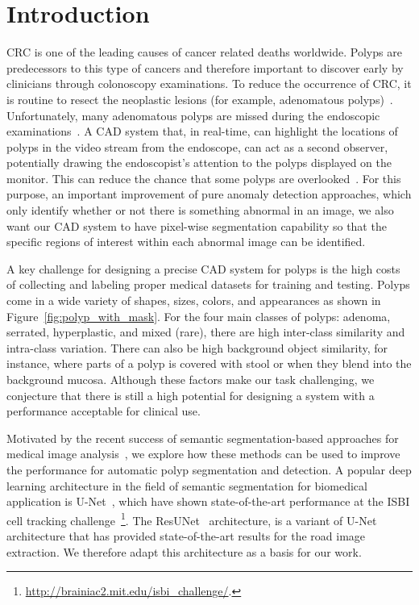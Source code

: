 \documentclass[conference]{IEEEtran}
\begin{document}
\vspace{-0.1cm}
\section{Introduction}
\label{sec:Introduction}
 
\ac{CRC} is one of the leading causes of cancer related deaths worldwide. Polyps are predecessors to this type of cancers and therefore important to discover early by clinicians through colonoscopy examinations.
To reduce the occurrence of \ac{CRC}, 
it is routine to resect the neoplastic lesions (for example, adenomatous polyps)~\cite{zauber2012colonoscopic}. 
Unfortunately, many adenomatous polyps are missed during the endoscopic examinations~\cite{van2006polyp}.
A \ac{CAD} system that, in real-time, can highlight the locations of polyps in the video stream from the endoscope, can act as a second observer, potentially drawing the endoscopist's attention to the polyps displayed on the monitor. This can reduce the chance that some polyps are overlooked~\cite{mori2018detecting}. For this purpose,  
an important improvement of pure anomaly detection approaches, which  only identify whether or not there is something abnormal in an image, we also want our \ac{CAD} system to have pixel-wise segmentation capability so that the specific regions of interest within each abnormal image can be identified.

A key challenge for designing a precise \ac{CAD} system
for polyps is the high costs of collecting and labeling proper medical datasets for training and testing. 
Polyps  come in a wide variety of shapes, sizes, colors, and appearances as shown  in Figure~\ref{fig:polyp_with_mask}. 
For the four main classes of polyps: adenoma, serrated, hyperplastic, and mixed (rare), there are high inter-class similarity and intra-class variation. 
There can also be high background object similarity, for instance, where parts of a polyp is covered with stool or when they blend into the background mucosa. Although these factors make our task challenging, we conjecture that 
there is still a high potential for designing a system with a performance acceptable for clinical use. 

Motivated by the recent success of semantic segmentation-based approaches for medical image analysis~\cite{milletari2016v,ronneberger2015u,zhang2018road}, we explore how these methods can be used to improve the performance for automatic polyp segmentation and detection. A popular deep learning architecture in the field of semantic segmentation for biomedical application is U-Net~\cite{ronneberger2015u}, which have shown state-of-the-art performance at the  ISBI cell tracking challenge~\footnote{ \href{http://brainiac2.mit.edu/isbi_challenge/}{http://brainiac2.mit.edu/isbi\_challenge/}.}. The ResUNet~\cite{zhang2018road} architecture, is a variant of U-Net architecture that has provided state-of-the-art results for the road image extraction. We therefore adapt this architecture as a basis for our work.
\end{document}
